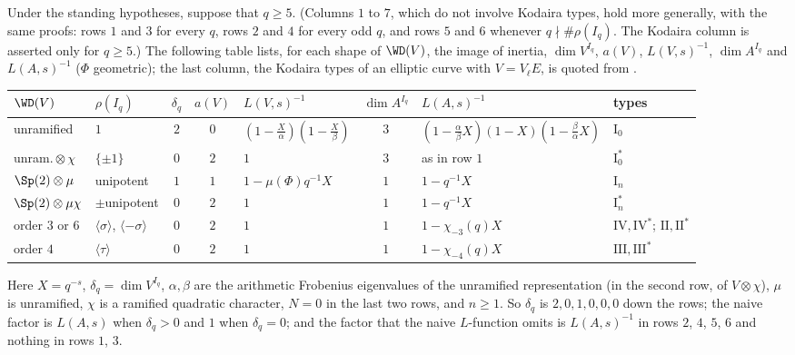 \begin{theorem}\label{thm:local:shapes-table}
Under the standing hypotheses, suppose that $q\ge5$. (Columns $1$ to $7$, which do not involve Kodaira types, hold more generally, with the same proofs:
rows $1$ and $3$ for every $q$, rows $2$ and $4$ for every odd $q$, and rows $5$ and $6$ whenever $q\nmid\#\rho(I_q)$. The Kodaira column is asserted
only for $q\ge5$.) The following table
lists, for each shape of $\WD(V)$, the image of inertia, $\dim V^{I_q}$, $a(V)$, $L(V,s)^{-1}$, $\dim A^{I_q}$ and $L(A,s)^{-1}$ ($\Phi$ geometric); the last column,
the Kodaira types of an elliptic curve with $V=V_\ell E$, is quoted from .
\begin{center}\footnotesize\setlength{\tabcolsep}{3pt}
\begin{tabular}{llcclcll}
\toprule
$\WD(V)$ & $\rho(I_q)$ & $\delta_q$ & $a(V)$ & $L(V,s)^{-1}$ & $\dim A^{I_q}$ & $L(A,s)^{-1}$ & types\\
\midrule
unramified & $1$ & $2$ & $0$ & $(1-\frac X\alpha)(1-\frac X\beta)$ & $3$ & $(1-\frac\alpha\beta X)(1-X)(1-\frac\beta\alpha X)$ & $\mathrm{I}_0$\\
unram.${}\otimes\chi$ & $\{\pm1\}$ & $0$ & $2$ & $1$ & $3$ & as in row $1$ & $\mathrm{I}_0^*$\\
$\Sp(2)\otimes\mu$ & unipotent & $1$ & $1$ & $1-\mu(\Phi)q^{-1}X$ & $1$ & $1-q^{-1}X$ & $\mathrm{I}_n$\\
$\Sp(2)\otimes\mu\chi$ & $\pm$unipotent & $0$ & $2$ & $1$ & $1$ & $1-q^{-1}X$ & $\mathrm{I}_n^*$\\
order $3$ or $6$ & $\langle\sigma\rangle$, $\langle-\sigma\rangle$ & $0$ & $2$ & $1$ & $1$ & $1-\chi_{-3}(q)X$ & $\mathrm{IV},\mathrm{IV}^*$; $\mathrm{II},\mathrm{II}^*$\\
order $4$ & $\langle\tau\rangle$ & $0$ & $2$ & $1$ & $1$ & $1-\chi_{-4}(q)X$ & $\mathrm{III},\mathrm{III}^*$\\
\bottomrule
\end{tabular}
\end{center}
Here $X=q^{-s}$, $\delta_q=\dim V^{I_q}$, $\alpha,\beta$ are the arithmetic Frobenius eigenvalues of the unramified representation (in the second row, of $V\otimes\chi$),
$\mu$ is unramified, $\chi$ is a ramified quadratic character, $N=0$ in the last two rows, and $n\ge1$. So $\delta_q$ is $2,0,1,0,0,0$ down the rows; the naive factor is $L(A,s)$ when $\delta_q>0$ and $1$ when $\delta_q=0$;
and the factor that the naive $L$-function omits is $L(A,s)^{-1}$ in rows $2$, $4$, $5$, $6$ and nothing in rows $1$, $3$.
\end{theorem}

